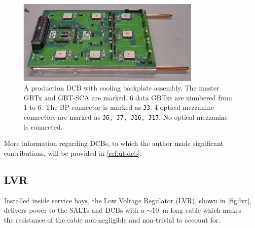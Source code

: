 \begin{figure}[!htb]
    \centering
    \includegraphics[width=0.8\textwidth]{./figs-ut-upgrade/dcb/dcb_prod.png}
    \caption{
        A production DCB with cooling backplate assembly.
        The master GBTx and GBT-SCA are marked.
        6 data GBTxs are numbered from 1 to 6.
        The BP connector is marked as \texttt{J3}.
        4 optical mezzanine connectors are marked as \texttt{J6, J7, J16, J17}.
        No optical mezzanine is connected.
    }
    \label{fig:dcb-prod}
\end{figure}

More information regarding DCBs,
to which the author made significant contributions,
will be provided in \cref{ref:ut:dcb}.


\subsection{LVR}
\label{ref:ut:overview:lvr}

Installed inside service bays, the Low Voltage Regulator (LVR),
shown in \cref{fig:lvr},
delivers power
to the SALTs and DCBs with a $\sim 10$~m long cable
which makes the resistance of the cable non-negligible and non-trivial to
account for.

